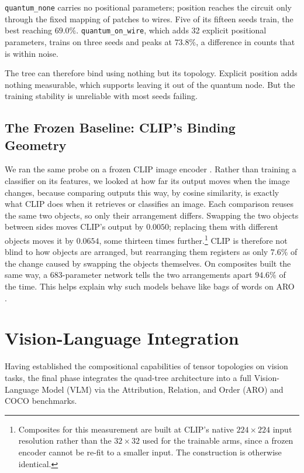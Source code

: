 \documentclass[12pt, a4paper, oneside]{report}
\begin{document}
\texttt{quantum\_none} carries no positional parameters; position reaches the circuit only through the fixed mapping of patches to wires. Five of its fifteen seeds train, the best reaching $69.0\%$. \texttt{quantum\_on\_wire}, which adds 32 explicit positional parameters, trains on three seeds and peaks at $73.8\%$, a difference in counts that is within noise.

The tree can therefore bind using nothing but its topology. Explicit position adds nothing measurable, which supports leaving it out of the quantum node. But the training stability is unreliable with most seeds failing.


\section{The Frozen Baseline: CLIP's Binding Geometry}
\label{sec:clip_geometry}

We ran the same probe on a frozen CLIP image encoder \cite{radford2021learning}. Rather than training a classifier on its features, we looked at how far its output moves when the image changes, because comparing outputs this way, by cosine similarity, is exactly what CLIP does when it retrieves or classifies an image. Each comparison reuses the same two objects, so only their arrangement differs. Swapping the two objects between sides moves CLIP's output by $0.0050$; replacing them with different objects moves it by $0.0654$, some thirteen times further.\footnote{Composites for this measurement are built at CLIP's native $224 \times 224$ input resolution rather than the $32 \times 32$ used for the trainable arms, since a frozen encoder cannot be re-fit to a smaller input. The construction is otherwise identical.} CLIP is therefore not blind to how objects are arranged, but rearranging them registers as only $7.6\%$ of the change caused by swapping the objects themselves. On composites built the same way, a 683-parameter network tells the two arrangements apart $94.6\%$ of the time. This helps explain why such models behave like bags of words on ARO \cite{yuksekgonul2023when}.


\chapter{Vision-Language Integration}
\label{ch:aro}

Having established the compositional capabilities of tensor topologies on vision tasks, the final phase integrates the quad-tree architecture into a full Vision-Language Model (VLM) via the Attribution, Relation, and Order (ARO) and COCO benchmarks.
\end{document}
